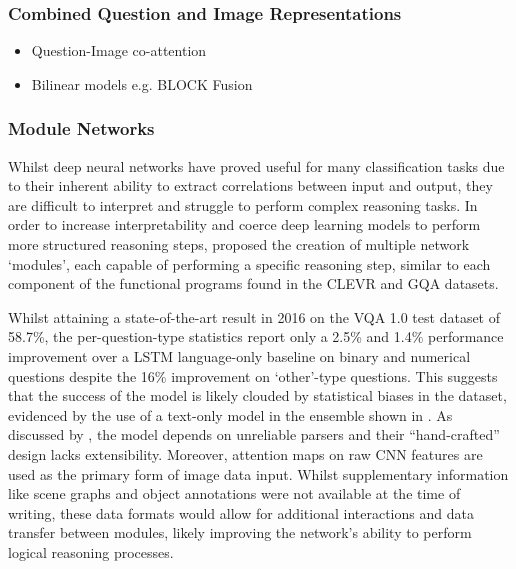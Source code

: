 \subsubsection*{Combined Question and Image Representations}

\begin{itemize}
    \item Question-Image co-attention \cite{lu2016hierarchical}
    \item Bilinear models e.g. BLOCK Fusion \cite{ben2019block}
\end{itemize}


\subsubsection*{Module Networks}

Whilst deep neural networks have proved useful for many classification tasks due to their inherent ability to extract correlations between input and output, they are difficult to interpret and struggle to perform complex reasoning tasks. In order to increase interpretability and coerce deep learning models to perform more structured reasoning steps, \citeauthor{andreas2016neural} proposed the creation of multiple network `modules', each capable of performing a specific reasoning step, similar to each component of the functional programs found in the CLEVR \cite{johnson2017clevr} and GQA \cite{hudson2019gqa} datasets.

\vspace{\baselineskip}

Whilst attaining a state-of-the-art result in 2016 on the VQA 1.0 test dataset \cite{antol2015vqa} of 58.7\%, the per-question-type statistics report only a 2.5\% and 1.4\% performance improvement over a LSTM language-only baseline on binary and numerical questions despite the 16\% improvement on `other'-type questions. This suggests that the success of the model is likely clouded by statistical biases in the dataset, evidenced by the use of a text-only model in the ensemble shown in \figureautorefname{ \ref{fig:andreas2016neural_neural_module_network}}. As discussed by \citeauthor{hudson2018compositional}, the model depends on unreliable parsers and their ``hand-crafted'' design lacks extensibility. Moreover, attention maps on raw CNN features are used as the primary form of image data input. Whilst supplementary information like scene graphs and object annotations were not available at the time of writing, these data formats would allow for additional interactions and data transfer between modules, likely improving the network's ability to perform logical reasoning processes.

